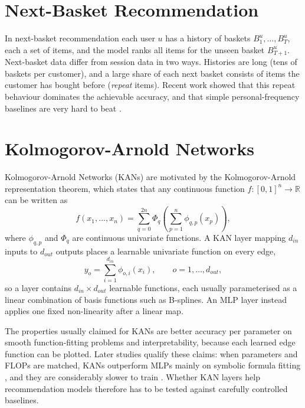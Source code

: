 \documentclass[12pt,a4paper]{report}
\begin{document}
\section{Next-Basket Recommendation}

In next-basket recommendation each user $u$ has a history of baskets
$B^u_1, \ldots, B^u_{T}$, each a set of items, and the model ranks all items for
the unseen basket $B^u_{T+1}$. Next-basket data differ from session data in two
ways. Histories are long (tens of baskets per customer), and a large share of
each next basket consists of items the customer has bought before (\emph{repeat}
items). Recent work showed that this repeat behaviour dominates the achievable
accuracy, and that simple personal-frequency baselines are very hard to beat
\cite{li2023}.

\section{Kolmogorov-Arnold Networks}

Kolmogorov-Arnold Networks (KANs) \cite{liu2025kan} are motivated by the
Kolmogorov-Arnold representation theorem, which states that any continuous
function $f:[0,1]^n \to \mathbb{R}$ can be written as
\begin{equation}
f(x_1, \ldots, x_n) = \sum_{q=0}^{2n} \Phi_q \left( \sum_{p=1}^{n} \phi_{q,p}(x_p) \right),
\end{equation}
where $\phi_{q,p}$ and $\Phi_q$ are continuous univariate functions. A KAN layer
mapping $d_{in}$ inputs to $d_{out}$ outputs places a learnable univariate
function on every edge,
\begin{equation}
y_o = \sum_{i=1}^{d_{in}} \phi_{o,i}(x_i), \qquad o = 1, \ldots, d_{out},
\end{equation}
so a layer contains $d_{in} \times d_{out}$ learnable functions, each usually
parameterised as a linear combination of basis functions such as B-splines. An
MLP layer instead applies one fixed non-linearity after a linear map.

The properties usually claimed for KANs are better accuracy per parameter on
smooth function-fitting problems and interpretability, because each learned edge
function can be plotted. Later studies qualify these claims: when parameters and
FLOPs are matched, KANs outperform MLPs mainly on symbolic formula fitting
\cite{yu2024}, and they are considerably slower to train \cite{hou2025}. Whether
KAN layers help recommendation models therefore has to be tested against
carefully controlled baselines.
\end{document}
